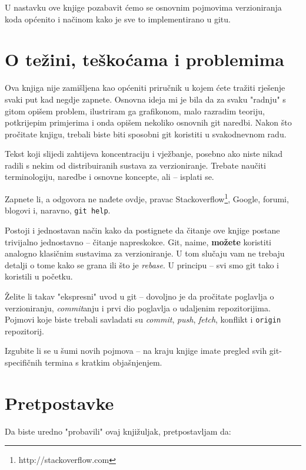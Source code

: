 U nastavku ove knjige pozabavit ćemo se osnovnim pojmovima verzioniranja koda općenito i načinom kako je sve to implementirano u gitu.

\section*{O težini, teškoćama i problemima}

Ova knjiga nije zamišljena kao općeniti priručnik u kojem ćete tražiti rješenje svaki put kad negdje zapnete.
Osnovna ideja mi je bila da za svaku "radnju" s gitom opišem problem, ilustriram ga grafikonom, malo razradim teoriju, potkrijepim primjerima i onda opišem nekoliko osnovnih git naredbi.
Nakon što pročitate knjigu, trebali biste biti sposobni git koristiti u svakodnevnom radu. 

Tekst koji slijedi zahtijeva koncentraciju i vježbanje, posebno ako niste nikad radili s nekim od distribuiranih sustava za verzioniranje.
Trebate naučiti terminologiju, naredbe i osnovne koncepte, ali -- isplati se.

Zapnete li, a odgovora ne nađete ovdje, pravac Stackoverflow\footnote{http://stackoverflow.com}, Google, 
forumi, blogovi i, naravno, \verb+git help+.

Postoji i jednostavan način kako da postignete da čitanje ove knjige postane trivijalno jednostavno -- čitanje napreskokce.
Git, naime, \textbf{možete} koristiti analogno klasičnim sustavima za verzioniranje. 
U tom slučaju vam ne trebaju detalji o tome kako se grana ili što je \emph{rebase}.
U principu -- svi smo git tako i koristili u početku.

Želite li takav "ekspresni" uvod u git -- dovoljno je da pročitate poglavlja o verzioniranju, \emph{commit}anju i prvi dio poglavlja o udaljenim repozitorijima.
Pojmovi koje biste trebali savladati su \emph{commit}, \emph{push}, \emph{fetch}, konflikt i \verb+origin+ repozitorij.

Izgubite li se u šumi novih pojmova -- na kraju knjige imate pregled svih git-specifičnih termina s kratkim objašnjenjem.

\section*{Pretpostavke}

Da biste uredno "probavili" ovaj knjižuljak, pretpostavljam da:

